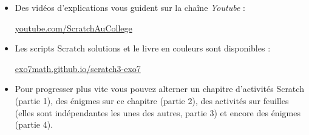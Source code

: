 \begin{minipage}{0.97\linewidth}
\begin{itemize}
  \item Des vidéos d'explications vous guident sur la chaîne \emph{Youtube} :

  \centerline{\href{https://www.youtube.com/c/ScratchAuCollege}{youtube.com/ScratchAuCollege}}
  
  \item Les scripts Scratch solutions et le livre en couleurs sont disponibles :

  \centerline{\href{https://exo7math.github.io/scratch3-exo7/}{exo7math.github.io/scratch3-exo7}}

  \item  Pour progresser plus vite vous pouvez alterner un chapitre  d'activités Scratch (partie 1), des énigmes sur ce chapitre (partie 2), des activités sur feuilles (elles sont indépendantes les unes des autres, partie 3) et encore des énigmes (partie 4).
\end{itemize}
\end{minipage}


\cleardoublepage
\thispagestyle{empty}
\tableofcontents
